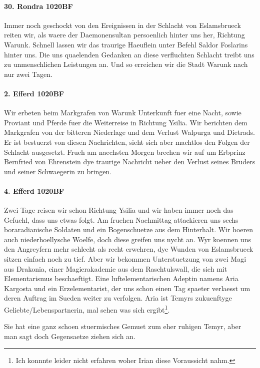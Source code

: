 \paragraph{30. Rondra 1020BF}
Immer noch geschockt von den Ereignissen in der Schlacht von Eslamsbrueck reiten wir, als waere der Daemonensultan persoenlich hinter uns her, Richtung Warunk. Schnell lassen wir das traurige Haeuflein unter Befehl Saldor Foslarins hinter uns. Die uns quaelenden Gedanken an diese verfluchten Schlacht treibt uns zu unmenschlichen Leistungen an. Und so erreichen wir die Stadt Warunk nach nur zwei Tagen.

\paragraph{2. Efferd 1020BF}
Wir erbeten beim Markgrafen von Warunk Unterkunft fuer eine Nacht, sowie Proviant und Pferde fuer die Weiterreise in Richtung Ysilia. Wir berichten dem Markgrafen von der bitteren Niederlage und dem Verlust Walpurga und Dietrads. Er ist bestuerzt von diesen Nachrichten, sieht sich aber machtlos den Folgen der Schlacht ausgesetzt. Frueh am naechsten Morgen brechen wir auf um Erbprinz Bernfried von Ehrenstein dye traurige Nachricht ueber den Verlust seines Bruders und seiner Schwaegerin zu bringen.

\paragraph{4. Efferd 1020BF}
Zwei Tage reisen wir schon Richtung Ysilia und wir haben immer noch das Gefuehl, dass uns etwas folgt. Am fruehen Nachmittag attackieren uns sechs boraradianische Soldaten und ein Bogenschuetze aus dem Hinterhalt. Wir hoeren auch niederhoellysche Woelfe, doch diese greifen uns nycht an. Wyr koennen uns den Angreyfern mehr schlecht als recht erwehren, dye Wunden von Eslamsbrueck sitzen einfach noch zu tief. Aber wir bekommen Unterstuetzung von zwei Magi aus Drakonia, einer Magierakademie aus dem Raschtulswall, die sich mit Elementarismus beschaeftigt. Eine luftelementarischen Adeptin namens Aria Kargosta und ein Erzelementarist, der uns schon einen Tag spaeter verlaesst um deren Auftrag im Sueden weiter zu verfolgen. Aria ist Temyrs zukuenftyge Geliebte/Lebenspartnerin, mal sehen was sich ergibt\footnote{Ich konnnte leider nicht erfahren woher Irian diese Voraussicht nahm.}.

Sie hat eine ganz schoen stuermisches Gemuet zum eher ruhigen Temyr, aber man sagt doch Gegensaetze ziehen sich an.

